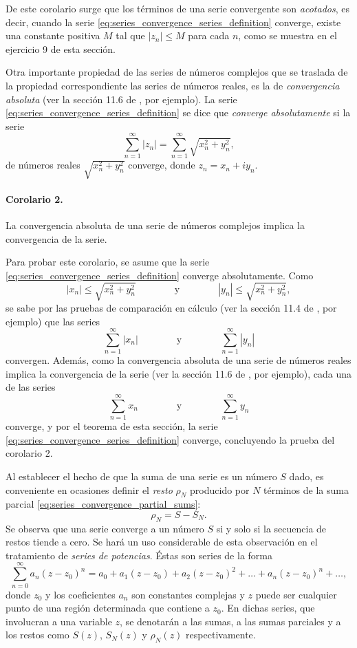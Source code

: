 \documentclass[a4paper]{report}
\begin{document}
De este corolario surge que los términos de una serie convergente son \emph{acotados}, es decir, cuando la serie \ref{eq:series_convergence_series_definition} converge, existe una constante positiva \(M\) tal que \(|z_n|\leq M\) para cada \(n\), como se muestra en el ejercicio 9 de esta sección.

Otra importante propiedad de las series de números complejos que se traslada de la propiedad correspondiente las series de números reales, es la de \emph{convergencia absoluta} (ver la sección 11.6 de \cite{stewart2016essential}, por ejemplo). La serie \ref{eq:series_convergence_series_definition} se dice que \emph{converge absolutamente} si la serie
\[
 \sum_{n=1}^\infty|z_n|=\sum_{n=1}^\infty\sqrt{x_n^2+y_n^2},
\]
de números reales \(\sqrt{x_n^2+y_n^2}\) converge, donde \(z_n=x_n+iy_n.\)

\paragraph{Corolario 2.} La convergencia absoluta de una serie de números complejos implica la convergencia de la serie.

Para probar este corolario, se asume que la serie \ref{eq:series_convergence_series_definition} converge absolutamente. Como
\[
 |x_n|\leq\sqrt{x_n^2+y_n^2}
 \qquad\qquad\textrm{y}\qquad\qquad
 |y_n|\leq\sqrt{x_n^2+y_n^2},
\]
se sabe por las pruebas de comparación en cálculo (ver la sección 11.4 de \cite{stewart2016essential}, por ejemplo) que las series 
\[
 \sum_{n=1}^\infty|x_n|
 \qquad\qquad\textrm{y}\qquad\qquad
 \sum_{n=1}^\infty|y_n|
\]
convergen. Además, como la convergencia absoluta de una serie de números reales implica la convergencia de la serie (ver la sección 11.6 de \cite{stewart2016essential}, por ejemplo), cada una de las series
\[
 \sum_{n=1}^\infty x_n
 \qquad\qquad\textrm{y}\qquad\qquad
 \sum_{n=1}^\infty y_n 
\]
converge, y por el teorema de esta sección, la serie \ref{eq:series_convergence_series_definition} converge, concluyendo la prueba del corolario 2.

Al establecer el hecho de que la suma de una serie es un número \(S\) dado, es conveniente en ocasiones definir el \emph{resto} \(\rho_N\) producido por \(N\) términos de la suma parcial \ref{eq:series_convergence_partial_sums}:
\[
 \rho_N=S-S_N.
\]
Se observa que una serie converge a un número \(S\) si y solo si la secuencia de restos tiende a cero. Se hará un uso considerable de esta observación en el tratamiento de \emph{series de potencias}. Éstas son series de la forma
\[
 \sum_{n=0}^\infty a_n(z-z_0)^n=a_0+a_1(z-z_0)+a_2(z-z_0)^2+\dots+a_n(z-z_0)^n+\dots,
\]
donde \(z_0\) y los coeficientes \(a_n\) son constantes complejas y \(z\) puede ser cualquier punto de una región determinada que contiene a \(z_0\). En dichas series, que involucran a una variable \(z\), se denotarán a las sumas, a las sumas parciales y a los restos como \(S(z)\), \(S_N(z)\) y \(\rho_N(z)\) respectivamente.
\end{document}
